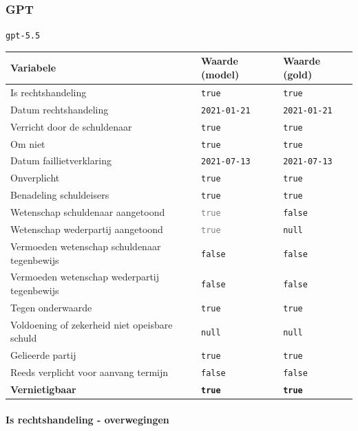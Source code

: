 \documentclass[
  dutch,
  a4paper,
]{article}
\begin{document}
\newpage


\subsubsection{GPT}\label{gpt-6}

\texttt{gpt-5.5}

\begin{center}
\small
\begin{tabular}{@{}p{7.4cm}p{2.6cm}p{2.6cm}@{}}
\toprule
Variabele & Waarde (model) & Waarde (gold) \\
\midrule
Is rechtshandeling & \texttt{true} & \texttt{true} \\
Datum rechtshandeling & \texttt{2021-01-21} & \texttt{2021-01-21} \\
Verricht door de schuldenaar & \texttt{true} & \texttt{true} \\
Om niet & \texttt{true} & \texttt{true} \\
Datum faillietverklaring & \texttt{2021-07-13} & \texttt{2021-07-13} \\
Onverplicht & \texttt{true} & \texttt{true} \\
Benadeling schuldeisers & \texttt{true} & \texttt{true} \\
Wetenschap schuldenaar aangetoond & \textcolor{gray}{\texttt{true}} & \texttt{false} \\
Wetenschap wederpartij aangetoond & \textcolor{gray}{\texttt{true}} & \texttt{null} \\
Vermoeden wetenschap schuldenaar tegenbewijs & \texttt{false} & \texttt{false} \\
Vermoeden wetenschap wederpartij tegenbewijs & \texttt{false} & \texttt{false} \\
Tegen onderwaarde & \texttt{true} & \texttt{true} \\
Voldoening of zekerheid niet opeisbare schuld & \texttt{null} & \texttt{null} \\
Gelieerde partij & \texttt{true} & \texttt{true} \\
Reeds verplicht voor aanvang termijn & \texttt{false} & \texttt{false} \\
\textbf{Vernietigbaar} & \textbf{\texttt{true}} & \textbf{\texttt{true}} \\
\bottomrule
\end{tabular}
\end{center}

\paragraph{Is rechtshandeling - overwegingen}\label{is-rechtshandeling---overwegingen-19}
\end{document}
